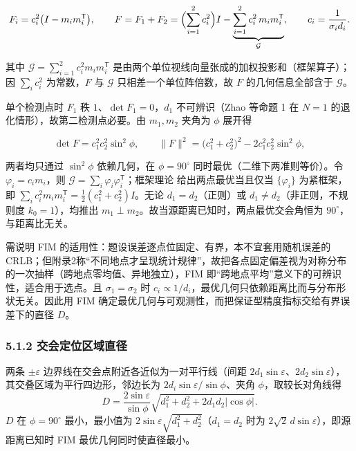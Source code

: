 \documentclass[UTF8, zihao=5,AutoFakeBold=2]{ctexart}
\begin{document}
		\begin{equation}
			F_i=c_i^2\bigl(I-m_im_i^{\mathsf T}\bigr),\qquad
			F=F_1+F_2=\Bigl(\sum_{i=1}^{2}c_i^2\Bigr)I-\underbrace{\sum_{i=1}^{2}c_i^2\,m_im_i^{\mathsf T}}_{\mathcal G},\qquad c_i=\frac{1}{\sigma_i d_i}.
			\label{eq:F2}
		\end{equation}
		
		其中 \(\mathcal G=\sum_{i=1}^2 c_i^2m_im_i^{\mathsf T}\) 是由两个单位视线向量张成的加权投影和（框架算子）；因 \(\sum_i c_i^2\) 为常数，\(F\) 与 \(\mathcal G\) 只相差一个单位阵倍数，故 \(F\) 的几何信息全部含于 \(\mathcal G\)。
		
		单个检测点时 \(F_1\) 秩 \(1\)、\(\det F_1=0\)，\(d_1\) 不可辨识（Zhao 等命题 1 在 \(N=1\) 的退化情形），故第二检测点必要。由 \(m_1,m_2\) 夹角为 \(\phi\) 展开得
		
		\begin{equation}
			\det F=c_1^2c_2^2\sin^2\phi,\qquad
			\lVert F\rVert^2=\bigl(c_1^2+c_2^2\bigr)^2-2c_1^2c_2^2\sin^2\phi,
			\label{eq:det}
		\end{equation}
		
		两者均只通过 \(\sin^2\phi\) 依赖几何，在 \(\phi=90^\circ\) 同时最优（二维下两准则等价）。令 \(\varphi_i=c_im_i\)，则 \(\mathcal G=\sum_i\varphi_i\varphi_i^{\mathsf T}\)；框架理论\cite{zhao2012} 给出两点最优当且仅当 \(\{\varphi_i\}\) 为紧框架，即 \(\sum_i c_i^2m_im_i^{\mathsf T}=\tfrac12(c_1^2+c_2^2)I\)。无论 \(d_1=d_2\)（正则）或 \(d_1\neq d_2\)（非正则，不规则度 \(k_0=1\)），均推出 \(m_1\perp m_2\)。故当源距离已知时，两点最优交会角恒为 \(90^\circ\)，与距离比无关。

		需说明 FIM 的适用性：题设误差逐点位固定、有界，本不宜套用随机误差的 CRLB；但附录2称“不同地点才呈现统计规律”，故把各点固定偏差视为对称分布的一次抽样（跨地点零均值、异地独立），FIM 即“跨地点平均”意义下的可辨识性，适合用于选点。且 \(\sigma_1=\sigma_2\) 时 \(c_i\propto1/d_i\)，最优几何只依赖距离比而与分布形状无关。因此用 FIM 确定最优几何与可观测性，而把保证型精度指标交给有界误差下的直径 \(D\)。

		\subsubsection*{5.1.2 交会定位区域直径}
		两条 \(\pm\varepsilon\) 边界线在交会点附近各近似为一对平行线（间距 \(2d_1\sin\varepsilon\)、\(2d_2\sin\varepsilon\)），其交叠区域为平行四边形，邻边长为 \(2d_i\sin\varepsilon/\sin\phi\)、夹角 \(\phi\)，取较长对角线得
		\begin{equation}
			D=\frac{2\sin\varepsilon}{\sin\phi}\sqrt{d_1^2+d_2^2+2d_1d_2|\cos\phi|}.
			\label{eq:D}
		\end{equation}
		\(D\) 在 \(\phi=90^\circ\) 最小，最小值为 \(2\sin\varepsilon\sqrt{d_1^2+d_2^2}\)（\(d_1=d_2\) 时为 \(2\sqrt2\,d\sin\varepsilon\)），即源距离已知时 FIM 最优几何同时使直径最小。
\end{document}
